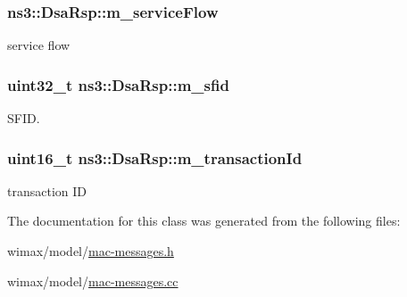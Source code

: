 \subsubsection[{\texorpdfstring{m\+\_\+service\+Flow}{m_serviceFlow}}]{ ns3\+::\+Dsa\+Rsp\+::m\+\_\+service\+Flow\hspace{0.3cm}{\ttfamily [private]}}\hypertarget{classns3_1_1DsaRsp_a34fe5554195969f8a9d59f429213fbbf}{}\label{classns3_1_1DsaRsp_a34fe5554195969f8a9d59f429213fbbf}


service flow 

\subsubsection[{\texorpdfstring{m\+\_\+sfid}{m_sfid}}]{\setlength{\rightskip}{0pt plus 5cm}uint32\+\_\+t ns3\+::\+Dsa\+Rsp\+::m\+\_\+sfid\hspace{0.3cm}{\ttfamily [private]}}\hypertarget{classns3_1_1DsaRsp_a0cee44f13b4be8f1efc51889b8bb9195}{}\label{classns3_1_1DsaRsp_a0cee44f13b4be8f1efc51889b8bb9195}


S\+F\+ID. 

\subsubsection[{\texorpdfstring{m\+\_\+transaction\+Id}{m_transactionId}}]{\setlength{\rightskip}{0pt plus 5cm}uint16\+\_\+t ns3\+::\+Dsa\+Rsp\+::m\+\_\+transaction\+Id\hspace{0.3cm}{\ttfamily [private]}}\hypertarget{classns3_1_1DsaRsp_a65c30343bc903c7df3f78bf96e6c7929}{}\label{classns3_1_1DsaRsp_a65c30343bc903c7df3f78bf96e6c7929}


transaction ID 



The documentation for this class was generated from the following files\+:\begin{DoxyCompactItemize}
\item 
wimax/model/\hyperlink{mac-messages_8h}{mac-\/messages.\+h}\item 
wimax/model/\hyperlink{mac-messages_8cc}{mac-\/messages.\+cc}\end{DoxyCompactItemize}
